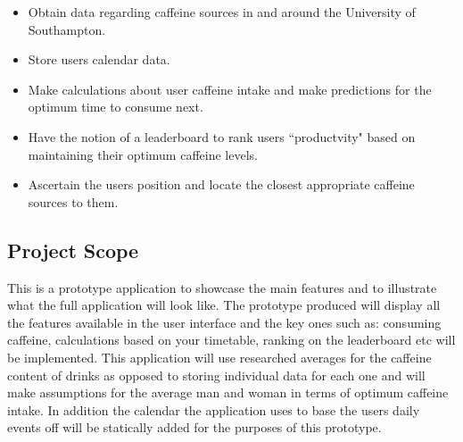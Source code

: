 \begin{itemize}
	\item{Obtain data regarding caffeine sources in and around the University of Southampton.}
	\item{Store users calendar data.}
	\item{Make calculations about user caffeine intake and make predictions for the optimum time to consume next.}
	\item{Have the notion of a leaderboard to rank users ``productvity" based on maintaining their optimum caffeine levels.}
	\item{Ascertain the users position and locate the closest appropriate caffeine sources to them.}
\end{itemize}

\subsection{Project Scope}
This is a prototype application to showcase the main features and to illustrate what the full application will look like. The prototype produced will display all the features available in the user interface and the key ones such as: consuming caffeine, calculations based on your timetable, ranking on the leaderboard etc will be implemented. This application will use researched averages for the caffeine content of drinks as opposed to storing individual data for each one and will make assumptions for the average man and woman in terms of optimum caffeine intake. In addition the calendar the application uses to base the users daily events off will be statically added for the purposes of this prototype. 
